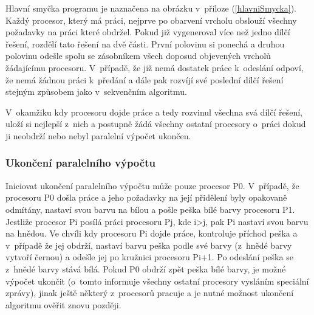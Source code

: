 \documentclass[12pt]{article}
\begin{document}
Hlavní smyčka programu je naznačena na obrázku v~příloze (\ref{hlavniSmycka}). Každý procesor, který má práci, nejprve po obarvení vrcholu obslouží všechny požadavky na práci které obdržel. Pokud již vygeneroval více než jedno dílčí řešení, rozdělí tato řešení na dvě části. První polovinu si ponechá a druhou polovinu odešle spolu se zásobníkem všech doposud objevených vrcholů žádajícímu procesoru. V~případě, že již nemá dostatek práce k~odeslání odpoví, že nemá žádnou práci k~předání a dále pak rozvíjí své poslední dílčí řešení stejným způsobem jako v~sekvenčním algoritmu.

V~okamžiku kdy procesoru dojde práce a tedy rozvinul všechna svá dílčí řešení, uloží si nejlepší z~nich a postupně žádá všechny ostatní procesory o~práci dokud ji neobdrží nebo nebyl paralelní výpočet ukončen.

\subsubsection{Ukončení paralelního výpočtu}

Iniciovat ukončení paralelního výpočtu může pouze procesor P0. V~případě, že procesoru P0 došla práce a jeho požadavky na její přidělení byly opakovaně odmítány, nastaví svou barvu na bílou a pošle peška bílé barvy procesoru P1. Jestliže procesor Pi posílá práci procesoru Pj, kde i>j, pak Pi nastaví svou barvu na hnědou. Ve chvíli kdy procesoru Pi dojde práce, kontroluje příchod peška a v~případě že jej obdrží, nastaví barvu peška podle své barvy (z~hnědé barvy vytvoří černou) a odešle jej po kružnici procesoru Pi+1. Po odeslání peška se z~hnědé barvy stává bílá. Pokud P0 obdrží zpět peška bílé barvy, je možné výpočet ukončit (o~tomto informuje všechny ostatní procesory vysláním speciální zprávy), jinak ještě některý z~procesorů pracuje a je nutné možnost ukončení algoritmu ověřit znovu později.
\end{document}
